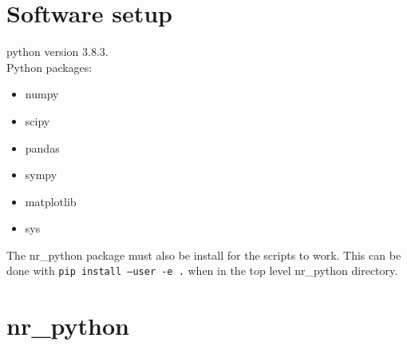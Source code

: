 \documentclass[a4paper]{article}
\begin{document}
\thispagestyle{empty}

\newpage

\tableofcontents
\newpage

\section{Software setup}%
\label{sec:software_setup}

python version 3.8.3.\\

Python packages:
\begin{itemize}
	\item numpy
	\item scipy
	\item pandas
	\item sympy
	\item matplotlib
	\item sys
\end{itemize}

The nr\_python package must also be install for the scripts to work. This can be done with
\texttt{pip install --user -e .} when in the top level nr\_python directory.

%


\newpage
\section{nr\_python}%
\label{sec:nr_python}

\inputminted{python}{../nr_python/nr_python/__init__.py}
\end{document}
